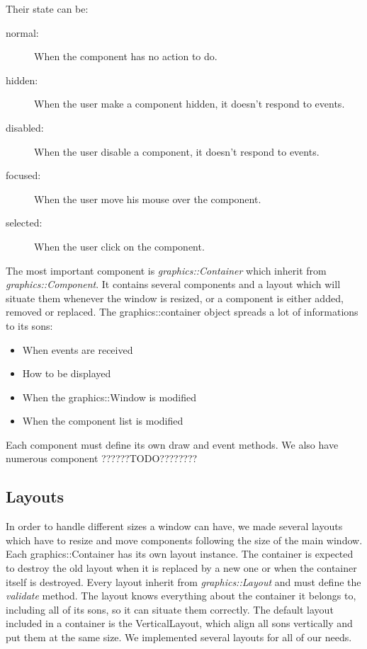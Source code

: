 \documentclass{scrreprt}
\begin{document}
		  Their state can be:
		  \begin{description}
		  \item[normal:]{When the component has no action to do.}
		  \item[hidden:]{When the user make a component hidden, it doesn't respond to events.}
		  \item[disabled:]{When the user disable a component, it doesn't respond to events.}
		  \item[focused:]{When the user move his mouse over the component.}
		  \item[selected:]{When the user click on the component.}
		  \end{description}

		  The most important component is \emph{graphics::Container} which inherit from \emph{graphics::Component}. It contains several components and a layout which will situate them whenever the window is resized, or a component is either added, removed or replaced. The graphics::container object spreads a lot of informations to its sons:
		  \begin{itemize}
		  \item{When events are received}
		  \item{How to be displayed}
		  \item{When the graphics::Window is modified}
		  \item{When the component list is modified}
		  \end{itemize}

		  Each component must define its own draw and event methods.
		  We also have numerous component ??????TODO????????

		  \subsection{Layouts}
		  In order to handle different sizes a window can have, we made several layouts which have to resize and move components following the size of the main window. Each graphics::Container has its own layout instance. The container is expected to destroy the old layout when it is replaced by a new one or when the container itself is destroyed. Every layout inherit from \emph{graphics::Layout} and must define the \emph{validate} method. 
		  The layout knows everything about the container it belongs to, including all of its sons, so it can situate them correctly.
	The default layout included in a container is the VerticalLayout, which align all sons vertically and put them at the same size.
We implemented several layouts for all of our needs.
\end{document}
